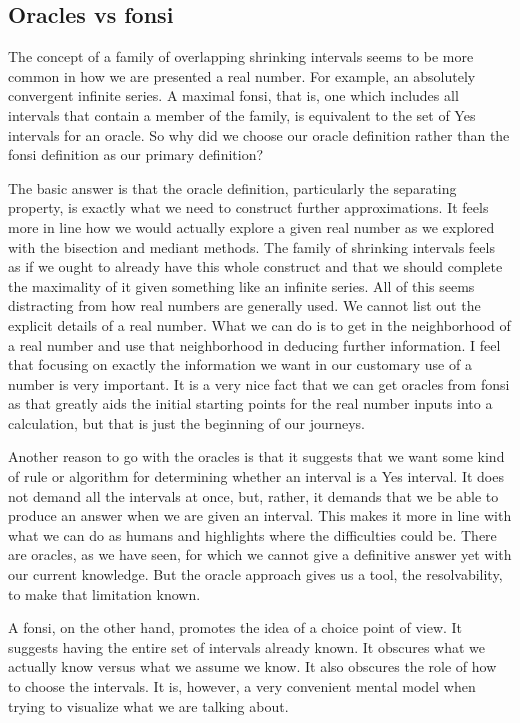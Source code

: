 \documentclass[12pt]{article}
\theoremstyle{remark}
\begin{document}
\subsection{Oracles vs fonsi}

The concept of a family of overlapping shrinking intervals seems to be more common in how we are presented a real number. For example, an absolutely convergent infinite series. A maximal fonsi, that is, one which includes all intervals that contain a member of the family, is equivalent to the set of Yes intervals for an oracle.  So why did we choose our oracle definition rather than the fonsi definition as our primary definition? 

The basic answer is that the oracle definition, particularly the separating property, is exactly what we need to construct further approximations. It feels more in line how we would actually explore a given real number as we explored with the bisection and mediant methods. The family of shrinking intervals feels as if we ought to already have this whole construct and that we should complete the maximality of it given something like an infinite series. All of this seems distracting from how real numbers are generally used. We cannot list out the explicit details of a real number. What we can do is to get in the neighborhood of a real number and use that neighborhood in deducing further information. I feel that focusing on exactly the information we want in our customary use of a number is very important. It is a very nice fact that we can get oracles from fonsi as that greatly aids the initial starting points for the real number inputs into a calculation, but that is just the beginning of our journeys. 

Another reason to go with the oracles is that it suggests that we want some kind of rule or algorithm for determining whether an interval is a Yes interval. It does not demand all the intervals at once, but, rather, it demands that we be able to produce an answer when we are given an interval. This makes it more in line with what we can do as humans and highlights where the difficulties could be. There are oracles, as we have seen, for which we cannot give a definitive answer yet with our current knowledge. But the oracle approach gives us a tool, the resolvability, to make that limitation known. 

A fonsi, on the other hand, promotes the idea of a choice point of view. It suggests having the entire set of intervals already known. It obscures what we actually know versus what we assume we know. It also obscures the role of how to choose the intervals. It is, however, a very convenient mental model when trying to visualize what we are talking about. 
\end{document}
